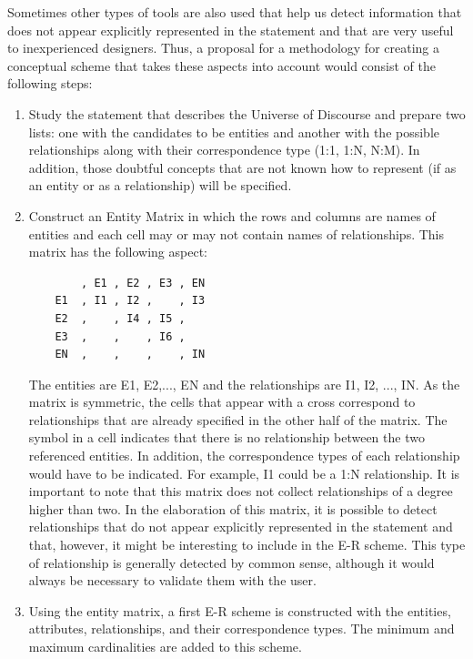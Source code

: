 \documentclass{article}
\numberwithin{figure}{section}
\begin{document}
Sometimes other types of tools are also used that help us detect information that does not appear explicitly represented in the statement and that are very useful to inexperienced designers.  Thus, a proposal for a methodology for creating a conceptual scheme that takes these aspects into account would consist of the following steps:

\begin{enumerate}
    \item Study the statement that describes the Universe of Discourse and prepare two lists: one with the candidates to be entities and another with the possible relationships along with their correspondence type (1:1, 1:N, N:M).  In addition, those doubtful concepts that are not known how to represent (if as an entity or as a relationship) will be specified.
    \item Construct an Entity Matrix in which the rows and columns are names of entities and each cell may or may not contain names of relationships.  This matrix has the following aspect:

    \begin{verbatim}
        , E1 , E2 , E3 , EN
    E1  , I1 , I2 ,    , I3
    E2  ,    , I4 , I5 ,
    E3  ,    ,    , I6 ,
    EN  ,    ,    ,    , IN
    \end{verbatim}

    The entities are E1, E2,..., EN and the relationships are I1, I2, ..., IN.  As the matrix is symmetric, the cells that appear with a cross correspond to relationships that are already specified in the other half of the matrix.  The symbol in a cell indicates that there is no relationship between the two referenced entities.  In addition, the correspondence types of each relationship would have to be indicated.  For example, I1 could be a 1:N relationship.  It is important to note that this matrix does not collect relationships of a degree higher than two.  In the elaboration of this matrix, it is possible to detect relationships that do not appear explicitly represented in the statement and that, however, it might be interesting to include in the E-R scheme.  This type of relationship is generally detected by common sense, although it would always be necessary to validate them with the user.

    \item Using the entity matrix, a first E-R scheme is constructed with the entities, attributes, relationships, and their correspondence types.  The minimum and maximum cardinalities are added to this scheme.


\end{enumerate}
\end{document}
